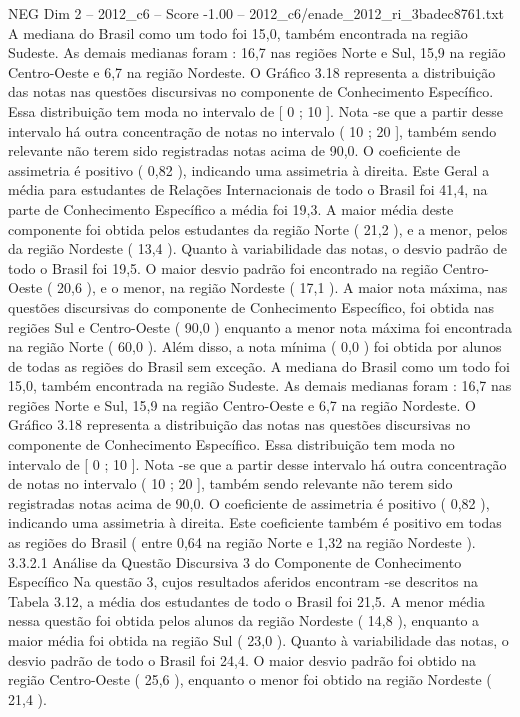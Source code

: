 \begin{textsample}{NEG Dim 2 – 2012\_c6 – Score -1.00 – 2012\_c6/enade\_2012\_ri\_3badec8761.txt}
A mediana do Brasil como um todo foi 15,0, também encontrada na região Sudeste.
As demais medianas foram : 16,7 nas regiões Norte e Sul, 15,9 na região Centro-Oeste e 6,7 na região Nordeste.
O Gráfico 3.18 representa a distribuição das notas nas questões discursivas no componente de Conhecimento Específico.
Essa distribuição tem moda no intervalo de [ 0 ; 10 ].
Nota -se que a partir desse intervalo há outra concentração de notas no intervalo ( 10 ; 20 ], também sendo relevante não terem sido registradas notas acima de 90,0.
O coeficiente de assimetria é positivo ( 0,82 ), indicando uma assimetria à direita.
Este Geral a média para estudantes de Relações Internacionais de todo o Brasil foi 41,4, na parte de Conhecimento Específico a média foi 19,3.
A maior média deste componente foi obtida pelos estudantes da região Norte ( 21,2 ), e a menor, pelos da região Nordeste ( 13,4 ).
Quanto à variabilidade das notas, o desvio padrão de todo o Brasil foi 19,5.
O maior desvio padrão foi encontrado na região Centro-Oeste ( 20,6 ), e o menor, na região Nordeste ( 17,1 ).
A maior nota máxima, nas questões discursivas do componente de Conhecimento Específico, foi obtida nas regiões Sul e Centro-Oeste ( 90,0 ) enquanto a menor nota máxima foi encontrada na região Norte ( 60,0 ).
Além disso, a nota mínima ( 0,0 ) foi obtida por alunos de todas as regiões do Brasil sem exceção.
A mediana do Brasil como um todo foi 15,0, também encontrada na região Sudeste.
As demais medianas foram : 16,7 nas regiões Norte e Sul, 15,9 na região Centro-Oeste e 6,7 na região Nordeste.
O Gráfico 3.18 representa a distribuição das notas nas questões discursivas no componente de Conhecimento Específico.
Essa distribuição tem moda no intervalo de [ 0 ; 10 ].
Nota -se que a partir desse intervalo há outra concentração de notas no intervalo ( 10 ; 20 ], também sendo relevante não terem sido registradas notas acima de 90,0.
O coeficiente de assimetria é positivo ( 0,82 ), indicando uma assimetria à direita.
Este coeficiente também é positivo em todas as regiões do Brasil ( entre 0,64 na região Norte e 1,32 na região Nordeste ). 3.3.2.1 Análise da Questão Discursiva 3 do Componente de Conhecimento Específico Na questão 3, cujos resultados aferidos encontram -se descritos na Tabela 3.12, a média dos estudantes de todo o Brasil foi 21,5.
A menor média nessa questão foi obtida pelos alunos da região Nordeste ( 14,8 ), enquanto a maior média foi obtida na região Sul ( 23,0 ).
Quanto à variabilidade das notas, o desvio padrão de todo o Brasil foi 24,4.
O maior desvio padrão foi obtido na região Centro-Oeste ( 25,6 ), enquanto o menor foi obtido na região Nordeste ( 21,4 ).

\end{textsample}
